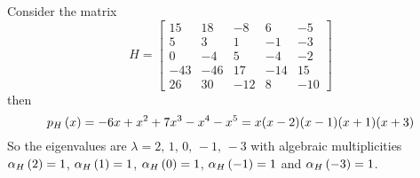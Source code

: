 \documentclass{ximera}
\begin{document}
\begin{example}
  Consider the matrix
  \[
    H=
    \begin{bmatrix}
      15 & 18 & -8 & 6 & -5\\
      5 & 3 & 1 & -1 & -3\\
      0 & -4 & 5 & -4 & -2\\
      -43 & -46 & 17 & -14 & 15\\
      26 & 30 & -12 & 8 & -10
    \end{bmatrix}
  \]
  then
  \[
    p_{H}\left(x\right)=-6x+x^2+7x^3-x^4-x^5=x(x-2)(x-1)(x+1)(x+3)
  \]
  So the eigenvalues are $\lambda=2,\,1,\,0,\,-1,\,-3$ with algebraic
  multiplicities $\alpha_{H}\left(2\right)=1$, $\alpha_{H}\left(1\right)=1$,
  $\alpha_{H}\left(0\right)=1$, $\alpha_{H}\left(-1\right)=1$ and $\alpha_{H}\left(-3\right)=1$.
  

\end{example}
\end{document}
